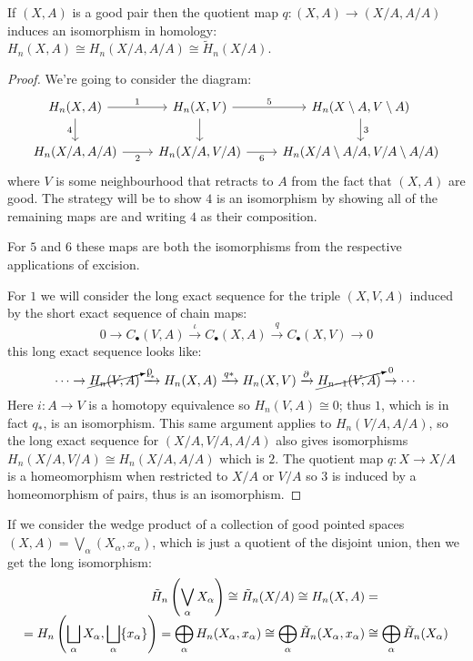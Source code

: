 \documentclass[a4paper]{article}
\begin{document}
\begin{proposition}
    If $(X,A)$ is a good pair then the quotient map $q:(X,A)\rightarrow(X/A,A/A)$ induces an isomorphism in homology: $H_n(X,A)\cong H_n(X/A,A/A) \cong \tilde{H}_n(X/A)$.
    \begin{proof}
        We're going to consider the diagram:
        \[\begin{tikzcd}
            H_n(X,A) \arrow[r, "1"] \arrow[d, "4", swap] & H_n(X,V) \arrow[r, "5"] \arrow[d] & H_n(X\setminus A, V\setminus A) \arrow[d, "3"]\\
            H_n(X/A,A/A) \arrow[r, "2", swap] & H_n(X/A,V/A) \arrow[r, "6", swap] & H_n(X/A\setminus A/A, V/A\setminus A/A)
        \end{tikzcd}\]
        where $V$ is some neighbourhood that retracts to $A$ from the fact that $(X,A)$ are good. The strategy will be to show $4$ is an isomorphism by showing all of the remaining maps are and writing $4$ as their composition.
        
        For $5$ and $6$ these maps are both the isomorphisms from the respective applications of excision.

        For $1$ we will consider the long exact sequence for the triple $(X,V,A)$ induced by the short exact sequence of chain maps: \[
        0\rightarrow C_\bullet(V,A) \xrightarrow{\iota} C_\bullet(X,A) \xrightarrow{q} C_\bullet(X,V) \rightarrow 0
        \]
        this long exact sequence looks like: \[
        \cdots\rightarrow \cancelto{_0}{H_n(V,A)} \xrightarrow{\iota_*} H_n(X,A) \xrightarrow{q*} H_n(X,V) \xrightarrow{\partial} \cancelto{_0}{H_{n-1}(V,A)} \rightarrow \cdots
        \] %
        Here $i:A\rightarrow V$ is a homotopy equivalence so $H_n(V,A)\cong 0$; thus $1$, which is in fact $q_*$, is an isomorphism. This same argument applies to $H_n(V/A,A/A)$, so the long exact sequence for $(X/A,V/A,A/A)$ also gives isomorphisms $H_n(X/A,V/A)\cong H_n(X/A,A/A)$ which is $2$. The quotient map $q:X\rightarrow X/A$ is a homeomorphism when restricted to $X/A$ or $V/A$ so $3$ is induced by a homeomorphism of pairs, thus is an isomorphism.
    \end{proof}
\end{proposition}
If we consider the wedge product of a collection of good pointed spaces $(X,A)=\bigvee_\alpha(X_\alpha,x_\alpha)$, which is just a quotient of the disjoint union, then we get the long isomorphism: 
\begin{align*}
    \tilde{H}_n\left( \bigvee_\alpha X_\alpha \right) \cong \tilde{H}_n(X/A)\cong H_n(X,A) &= \\[-5pt]
    = H_n\left( \bigsqcup_\alpha X_\alpha,\bigsqcup_\alpha\{x_\alpha\} \right) = \bigoplus_\alpha H_n(X_\alpha,x_\alpha)\cong \bigoplus_\alpha \tilde{H}_n(X_\alpha,x_\alpha) &\cong \bigoplus_\alpha\tilde{H}_n(X_\alpha)
\end{align*}
\end{document}
